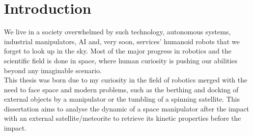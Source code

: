 \documentclass[a4paper,12pt,oneside]{report}
\begin{document}
\newpage

\begin{abstract}


\end{abstract}

\newpage


\tableofcontents

\chapter*{Introduction}
We live in a society overwhelmed by such technology, autonomous systems, industrial manipulators, AI and, very soon, services' humanoid robots that we forget to look up in the sky. Most of the major progress in robotics and the scientific field is done in space, where human curiosity is pushing our abilities beyond any imaginable scenario.\\
This thesis was born due to my curiosity in the field of robotics merged with the need to face space and modern problems, such as the berthing and docking of external objects by a manipulator or the tumbling of a spinning satellite. This dissertation aims to analyse the dynamic of a space manipulator after the impact with an external satellite/meteorite to retrieve its kinetic properties before the impact.\\
\clearpage
{}
\end{document}
